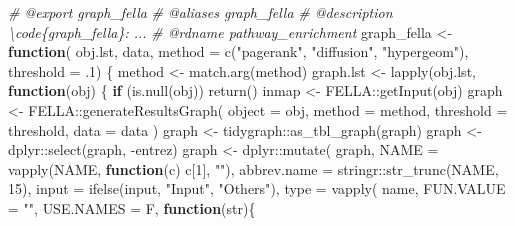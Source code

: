 \documentclass[
]{article}
\newenvironment{Shaded}{\begin{snugshade}}{\end{snugshade}}
\newcommand{\AttributeTok}[1]{\textcolor[rgb]{0.77,0.63,0.00}{#1}}
\newcommand{\CommentTok}[1]{\textcolor[rgb]{0.56,0.35,0.01}{\textit{#1}}}
\newcommand{\ControlFlowTok}[1]{\textcolor[rgb]{0.13,0.29,0.53}{\textbf{#1}}}
\newcommand{\DecValTok}[1]{\textcolor[rgb]{0.00,0.00,0.81}{#1}}
\newcommand{\FunctionTok}[1]{\textcolor[rgb]{0.00,0.00,0.00}{#1}}
\newcommand{\NormalTok}[1]{#1}
\newcommand{\OtherTok}[1]{\textcolor[rgb]{0.56,0.35,0.01}{#1}}
\newcommand{\SpecialCharTok}[1]{\textcolor[rgb]{0.00,0.00,0.00}{#1}}
\newcommand{\StringTok}[1]{\textcolor[rgb]{0.31,0.60,0.02}{#1}}
\begin{document}
\begin{Shaded}
\begin{Highlighting}[]
\CommentTok{\#\textquotesingle{} @export graph\_fella}
\CommentTok{\#\textquotesingle{} @aliases graph\_fella}
\CommentTok{\#\textquotesingle{} @description \textbackslash{}code\{graph\_fella\}: ...}
\CommentTok{\#\textquotesingle{} @rdname pathway\_enrichment}
\NormalTok{graph\_fella }\OtherTok{\textless{}{-}} \ControlFlowTok{function}\NormalTok{( obj.lst, data, }\AttributeTok{method =} \FunctionTok{c}\NormalTok{(}\StringTok{"pagerank"}\NormalTok{, }\StringTok{"diffusion"}\NormalTok{, }\StringTok{"hypergeom"}\NormalTok{),}
  \AttributeTok{threshold =}\NormalTok{ .}\DecValTok{1}\NormalTok{)}
\NormalTok{\{}
\NormalTok{  method }\OtherTok{\textless{}{-}} \FunctionTok{match.arg}\NormalTok{(method)}
\NormalTok{  graph.lst }\OtherTok{\textless{}{-}}
    \FunctionTok{lapply}\NormalTok{(obj.lst,}
      \ControlFlowTok{function}\NormalTok{(obj) \{}
        \ControlFlowTok{if}\NormalTok{ (}\FunctionTok{is.null}\NormalTok{(obj))}
          \FunctionTok{return}\NormalTok{()}
\NormalTok{        inmap }\OtherTok{\textless{}{-}}\NormalTok{ FELLA}\SpecialCharTok{::}\FunctionTok{getInput}\NormalTok{(obj)}
\NormalTok{        graph }\OtherTok{\textless{}{-}}\NormalTok{ FELLA}\SpecialCharTok{::}\FunctionTok{generateResultsGraph}\NormalTok{(}
          \AttributeTok{object =}\NormalTok{ obj,}
          \AttributeTok{method =}\NormalTok{ method,}
          \AttributeTok{threshold =}\NormalTok{ threshold,}
          \AttributeTok{data =}\NormalTok{ data}
\NormalTok{        )}
\NormalTok{        graph }\OtherTok{\textless{}{-}}\NormalTok{ tidygraph}\SpecialCharTok{::}\FunctionTok{as\_tbl\_graph}\NormalTok{(graph)}
\NormalTok{        graph }\OtherTok{\textless{}{-}}\NormalTok{ dplyr}\SpecialCharTok{::}\FunctionTok{select}\NormalTok{(graph, }\SpecialCharTok{{-}}\NormalTok{entrez)}
\NormalTok{        graph }\OtherTok{\textless{}{-}}\NormalTok{ dplyr}\SpecialCharTok{::}\FunctionTok{mutate}\NormalTok{(}
\NormalTok{          graph, }\AttributeTok{NAME =} \FunctionTok{vapply}\NormalTok{(NAME, }\ControlFlowTok{function}\NormalTok{(c) c[}\DecValTok{1}\NormalTok{], }\StringTok{""}\NormalTok{),}
          \AttributeTok{abbrev.name =}\NormalTok{ stringr}\SpecialCharTok{::}\FunctionTok{str\_trunc}\NormalTok{(NAME, }\DecValTok{15}\NormalTok{),}
          \AttributeTok{input =} \FunctionTok{ifelse}\NormalTok{(input, }\StringTok{"Input"}\NormalTok{, }\StringTok{"Others"}\NormalTok{),}
          \AttributeTok{type =} \FunctionTok{vapply}\NormalTok{(}
\NormalTok{            name, }\AttributeTok{FUN.VALUE =} \StringTok{""}\NormalTok{, }\AttributeTok{USE.NAMES =}\NormalTok{ F,}
            \ControlFlowTok{function}\NormalTok{(str)\{}

\end{Highlighting}
\end{Shaded}
\end{document}
